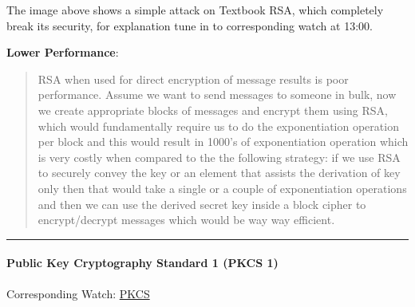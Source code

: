 \documentclass[11pt]{article}
\begin{document}
The image above shows a simple attack on Textbook RSA, which completely
break its security, for explanation tune in to corresponding watch at
13:00.

\textbf{Lower Performance}:

\begin{quote}
RSA when used for direct encryption of message results is poor
performance. Assume we want to send messages to someone in bulk, now we
create appropriate blocks of messages and encrypt them using RSA, which
would fundamentally require us to do the exponentiation operation per
block and this would result in 1000's of exponentiation operation which
is very costly when compared to the the following strategy: if we use
RSA to securely convey the key or an element that assists the derivation
of key only then that would take a single or a couple of exponentiation
operations and then we can use the derived secret key inside a block
cipher to encrypt/decrypt messages which would be way way efficient.
\end{quote}

\begin{center}\rule{0.5\linewidth}{\linethickness}\end{center}

    \hypertarget{public-key-cryptography-standard-1-pkcs-1}{%
\paragraph{Public Key Cryptography Standard 1 (PKCS
1)}\label{public-key-cryptography-standard-1-pkcs-1}}

Corresponding Watch:
\href{https://www.coursera.org/learn/crypto/lecture/JwjDq/pkcs-1}{PKCS}
\end{document}
